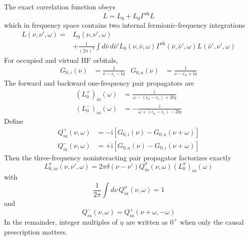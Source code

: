 \documentclass[aip,jcp,reprint,noshowkeys,superscriptaddress]{revtex4-1}
\newcommand{\eps}{\epsilon}
\newcommand{\ii}{\mathrm{i}}
\newcommand{\eh}{\text{eh}}
\begin{document}
The exact correlation function obeys
\begin{equation}
	L
	=
	L_0
	+
	L_0\Gamma^\eh L
	\label{eq:BSE_symbolic}
\end{equation}
which in frequency space contains two internal fermionic-frequency integrations
\begin{equation}
	\begin{split}
	L(\nu,\nu',\omega)
	={}&
	L_0(\nu,\nu',\omega)
	\\
	&+
	\frac{1}{(2\pi)^2}
	\int d\bar\nu\,d\bar\nu'
	L_0(\nu,\bar\nu,\omega)
	\Gamma^\eh(\bar\nu,\bar\nu',\omega)
	L(\bar\nu',\nu',\omega)
	\end{split}
	\label{eq:BSE_three_frequency}
\end{equation}
For occupied and virtual HF orbitals,
\begin{align}
	G_{0,i}(\nu)
	&=
	\frac{1}{\nu-\eps_i-\ii\eta}
	&
	G_{0,a}(\nu)
	&=
	\frac{1}{\nu-\eps_a+\ii\eta}
	\label{eq:G0}
\end{align}
The forward and backward one-frequency pair propagators are
\begin{align}
	(L_0^+)_{ia}(\omega)
	&=
	\frac{\ii}
	{\omega-(\eps_a-\eps_i)+2\ii\eta}
	\\
	(L_0^-)_{ia}(\omega)
	&=
	-\frac{\ii}
	{\omega+(\eps_a-\eps_i)-2\ii\eta}
	\label{eq:L0_pm}
\end{align}
Define
\begin{align}
	Q^+_{ia}(\nu,\omega)
	&=
	-\ii
	\left[
	G_{0,i}(\nu)
	-
	G_{0,a}(\nu+\omega)
	\right]
	\\
	Q^-_{ia}(\nu,\omega)
	&=
	+\ii
	\left[
	G_{0,a}(\nu)
	-
	G_{0,i}(\nu+\omega)
	\right]
	\label{eq:Q_pm}
\end{align}
Then the three-frequency noninteracting pair propagator factorizes exactly
\begin{equation}
	L_{0,ia}^{\sigma}(\nu,\nu',\omega)
	=
	2\pi\delta(\nu-\nu')
	Q^\sigma_{ia}(\nu,\omega)
	(L_0^\sigma)_{ia}(\omega)
	\label{eq:L0_factorization}
\end{equation}
with
\begin{equation}
	\frac{1}{2\pi}
	\int d\nu\,
	Q^\sigma_{ia}(\nu,\omega)
	=
	1
	\label{eq:Q_normalization}
\end{equation}
and
\begin{equation}
	Q^-_{ia}(\nu,\omega)
	=
	Q^+_{ia}(\nu+\omega,-\omega)
	\label{eq:Q_reversal}
\end{equation}
In the remainder, integer multiples of $\eta$ are written as $0^+$ when only the causal prescription matters.
\end{document}
